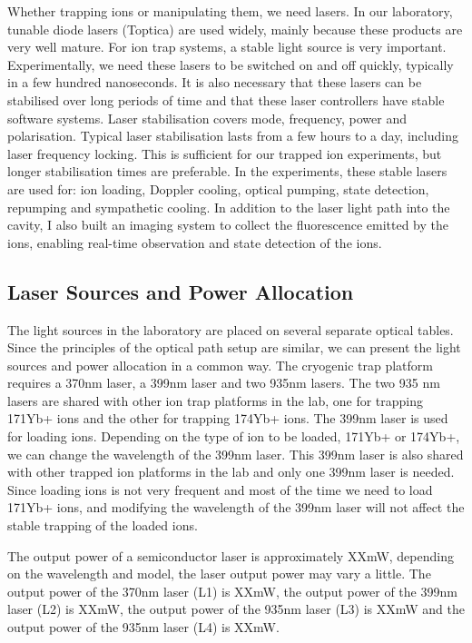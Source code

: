 Whether trapping ions or manipulating them, we need lasers. In our laboratory, tunable diode lasers (Toptica) are used widely, mainly because these products are very well mature. For ion trap systems, a stable light source is very important. Experimentally, we need these lasers to be switched on and off quickly, typically in a few hundred nanoseconds. It is also necessary that these lasers can be stabilised over long periods of time and that these laser controllers have stable software systems. Laser stabilisation covers mode, frequency, power and polarisation. Typical laser stabilisation lasts from a few hours to a day, including laser frequency locking. This is sufficient for our trapped ion experiments, but longer stabilisation times are preferable. In the experiments, these stable lasers are used for: ion loading, Doppler cooling, optical pumping, state detection, repumping and sympathetic cooling. In addition to the laser light path into the cavity, I also built an imaging system to collect the fluorescence emitted by the ions, enabling real-time observation and state detection of the ions.

\subsection{Laser Sources and Power Allocation}

The light sources in the laboratory are placed on several separate optical tables. Since the principles of the optical path setup are similar, we can present the light sources and power allocation in a common way. The cryogenic trap platform requires a 370nm laser, a 399nm laser and two 935nm lasers. The two 935 nm lasers are shared with other ion trap platforms in the lab, one for trapping 171Yb+ ions and the other for trapping 174Yb+ ions. The 399nm laser is used for loading ions. Depending on the type of ion to be loaded, 171Yb+ or 174Yb+, we can change the wavelength of the 399nm laser. This 399nm laser is also shared with other trapped ion platforms in the lab and only one 399nm laser is needed. Since loading ions is not very frequent and most of the time we need to load 171Yb+ ions, and modifying the wavelength of the 399nm laser will not affect the stable trapping of the loaded ions.

The output power of a semiconductor laser is approximately XXmW, depending on the wavelength and model, the laser output power may vary a little. The output power of the 370nm laser (L1) is XXmW, the output power of the 399nm laser (L2) is XXmW, the output power of the 935nm laser (L3) is XXmW and the output power of the 935nm laser (L4) is XXmW.


